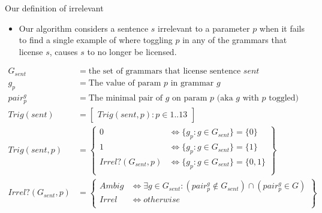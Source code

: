 \documentclass[presentation]{beamer}
\begin{document}
\begin{frame}[shrink=12,label={sec:orgc63b381}]{Our definition of irrelevant}
\begin{itemize}
\item Our algorithm considers a sentence \(s\) irrelevant to a parameter \(p\) when it
fails to find a single example of where toggling \(p\) in any of the grammars
that license \(s\), causes \(s\) to no longer be licensed.
\end{itemize}

\begin{align*}
G_{sent} &= \text{the set of grammars that license sentence $sent$} \\
g_p &= \text{The value of param $p$ in grammar $g$} \\
pair_p^g &= \text{The minimal pair of $g$ on param $p$ (aka $g$ with $p$ toggled)} \\
  Trig(sent) &= \begin{bmatrix} Trig(sent, p) : p \in 1..13 \end{bmatrix} \\
  Trig(sent, p) &= \left\{\begin{array}{lr}
      0                        & \iff \{g_p : g \in G_{sent} \} = \{0\} \\
      1                        & \iff \{g_p : g \in G_{sent} \} = \{1\}\\
      Irrel?(G_{sent}, p) & \iff \{g_p : g \in G_{sent} \} = \{0, 1\} \\
      \end{array}\right\} \\
Irrel?(G_{sent}, p) &= \left\{\begin{array}{lr}
      Ambig                        & \iff \exists g \in G_{sent} :
                                     (pair_p^g \notin G_{sent}) \cap (pair_p^g \in G) \\
      Irrel                        & \iff  otherwise \\
      \end{array}\right\} \\
\end{align*}
\end{frame}
\end{document}
